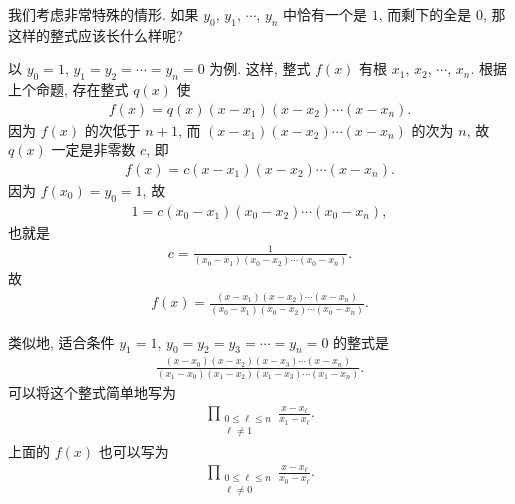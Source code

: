 \begin{example}
    我们考虑非常特殊的情形. 如果 $y_0$, $y_1$, $\cdots$, $y_n$ 中恰有一个是 $1$, 而剩下的全是 $0$, 那这样的整式应该长什么样呢?

    以 $y_0 = 1$, $y_1 = y_2 = \cdots = y_n = 0$ 为例. 这样, 整式 $f(x)$ 有根 $x_1$, $x_2$, $\cdots$, $x_n$. 根据上个命题, 存在整式 $q(x)$ 使
    \begin{align*}
        f(x) = q(x) (x - x_1) (x - x_2) \cdots (x - x_n).
    \end{align*}
    因为 $f(x)$ 的次低于 $n+1$, 而 $(x - x_1) (x - x_2) \cdots (x - x_n)$ 的次为 $n$, 故 $q(x)$ 一定是非零数 $c$, 即
    \begin{align*}
        f(x) = c (x - x_1) (x - x_2) \cdots (x - x_n).
    \end{align*}
    因为 $f(x_0) = y_0 = 1$, 故
    \begin{align*}
        1 = c (x_0 - x_1) (x_0 - x_2) \cdots (x_0 - x_n),
    \end{align*}
    也就是
    \begin{align*}
        c = \frac{1}{(x_0 - x_1) (x_0 - x_2) \cdots (x_0 - x_n)}.
    \end{align*}
    故
    \begin{align*}
        f(x) = \frac{(x - x_1) (x - x_2) \cdots (x - x_n)}{(x_0 - x_1) (x_0 - x_2) \cdots (x_0 - x_n)}.
    \end{align*}

    类似地, 适合条件 $y_1 = 1$, $y_0 = y_2 = y_3 = \cdots = y_n = 0$ 的整式是
    \begin{align*}
        \frac{(x - x_0)(x - x_2)(x - x_3) \cdots (x - x_n)}{(x_1 - x_0)(x_1 - x_2)(x_1 - x_3) \cdots (x_1 - x_n)}.
    \end{align*}
    可以将这个整式简单地写为
    \begin{align*}
        \prod_{\begin{smallmatrix}0 \leq \ell \leq n \\\ell \neq 1\end{smallmatrix}} \frac{x - x_\ell}{x_1 - x_\ell}.
    \end{align*}
    上面的 $f(x)$ 也可以写为
    \begin{align*}
        \prod_{\begin{smallmatrix}0 \leq \ell \leq n \\\ell \neq 0\end{smallmatrix}} \frac{x - x_\ell}{x_0 - x_\ell}.
    \end{align*}
\end{example}

